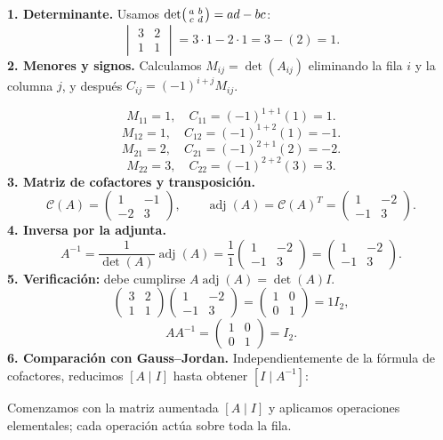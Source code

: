 \documentclass[12pt]{article}
\theoremstyle{remark}
\newcommand{\adj}{\operatorname{adj}}
\begin{document}
\textbf{1. Determinante.}
Usamos $\det\begin{psmallmatrix}a&b\\c&d\end{psmallmatrix}=ad-bc$:
\[
\begin{vmatrix}3&2\\1&1\end{vmatrix}=3\cdot 1-2\cdot 1=3-(2)=1.
\]
\textbf{2. Menores y signos.} Calculamos $M_{ij}=\det(A_{ij})$ eliminando la fila $i$ y la columna $j$, y después $C_{ij}=(-1)^{i+j}M_{ij}$.

\[
M_{11}=1,\quad C_{11}=(-1)^{1+1}(1)=1.
\]
\[
M_{12}=1,\quad C_{12}=(-1)^{1+2}(1)=-1.
\]
\[
M_{21}=2,\quad C_{21}=(-1)^{2+1}(2)=-2.
\]
\[
M_{22}=3,\quad C_{22}=(-1)^{2+2}(3)=3.
\]
\textbf{3. Matriz de cofactores y transposición.}
\[
\mathcal{C}(A)=\begin{pmatrix}1&-1\\-2&3\end{pmatrix},\qquad\adj(A)=\mathcal{C}(A)^T=\begin{pmatrix}1&-2\\-1&3\end{pmatrix}.
\]
\textbf{4. Inversa por la adjunta.}
\[
A^{-1}=\frac1{\det(A)}\adj(A)=\frac1{1}\begin{pmatrix}1&-2\\-1&3\end{pmatrix}=\begin{pmatrix}1&-2\\-1&3\end{pmatrix}.
\]
\textbf{5. Verificación:} debe cumplirse $A\adj(A)=\det(A)I$.
\[
\begin{pmatrix}3&2\\1&1\end{pmatrix}\begin{pmatrix}1&-2\\-1&3\end{pmatrix}=\begin{pmatrix}1&0\\0&1\end{pmatrix}=1I_{2},
\]
\[
AA^{-1}=\begin{pmatrix}1&0\\0&1\end{pmatrix}=I_{2}.
\]
\textbf{6. Comparación con Gauss--Jordan.} Independientemente de la fórmula de cofactores, reducimos $[A\mid I]$ hasta obtener $[I\mid A^{-1}]$:

Comenzamos con la matriz aumentada $[A\mid I]$ y aplicamos operaciones elementales; cada operación actúa sobre toda la fila.
\end{document}
